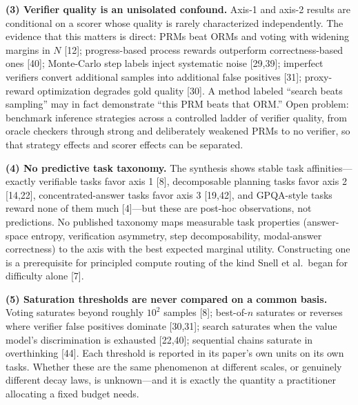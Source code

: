 \documentclass[10pt]{article}
\begin{document}
\textbf{(3) Verifier quality is an unisolated confound.} Axis-1 and axis-2 results are conditional on a scorer whose quality is rarely characterized independently. The evidence that this matters is direct: PRMs beat ORMs and voting with widening margins in $N$ [12]; progress-based process rewards outperform correctness-based ones [40]; Monte-Carlo step labels inject systematic noise [29,39]; imperfect verifiers convert additional samples into additional false positives [31]; proxy-reward optimization degrades gold quality [30]. A method labeled ``search beats sampling'' may in fact demonstrate ``this PRM beats that ORM.'' Open problem: benchmark inference strategies across a controlled ladder of verifier quality, from oracle checkers through strong and deliberately weakened PRMs to no verifier, so that strategy effects and scorer effects can be separated.

\textbf{(4) No predictive task taxonomy.} The synthesis shows stable task affinities---exactly verifiable tasks favor axis 1 [8], decomposable planning tasks favor axis 2 [14,22], concentrated-answer tasks favor axis 3 [19,42], and GPQA-style tasks reward none of them much [4]---but these are post-hoc observations, not predictions. No published taxonomy maps measurable task properties (answer-space entropy, verification asymmetry, step decomposability, modal-answer correctness) to the axis with the best expected marginal utility. Constructing one is a prerequisite for principled compute routing of the kind Snell et al.\ began for difficulty alone [7].

\textbf{(5) Saturation thresholds are never compared on a common basis.} Voting saturates beyond roughly $10^2$ samples [8]; best-of-$n$ saturates or reverses where verifier false positives dominate [30,31]; search saturates when the value model's discrimination is exhausted [22,40]; sequential chains saturate in overthinking [44]. Each threshold is reported in its paper's own units on its own tasks. Whether these are the same phenomenon at different scales, or genuinely different decay laws, is unknown---and it is exactly the quantity a practitioner allocating a fixed budget needs.
\end{document}
